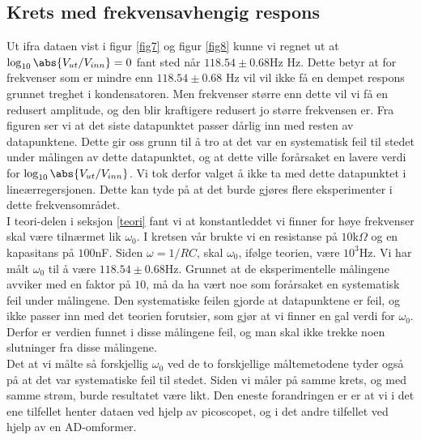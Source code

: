 \documentclass[%
 reprint,
 amsmath,amssymb,
 aps,
]{revtex4-1}
\begin{document}
\subsection{Krets med frekvensavhengig respons}
Ut ifra dataen vist i figur \ref{fig7} og figur \ref{fig8} kunne vi regnet ut at $\log_{10} \abs{{V_{ut}/V_{inn}}} = 0$ fant sted når $118.54 \pm 0.68$Hz Hz. Dette betyr at for frekvenser som er mindre enn $118.54 \pm 0.68$ Hz vil vil ikke få en dempet respons grunnet treghet i kondensatoren. Men frekvenser større enn dette vil vi få en redusert amplitude, og den blir kraftigere redusert jo større frekvensen er. Fra figuren ser vi at det siste datapunktet passer dårlig inn med resten av datapunktene. Dette gir oss grunn til å tro at det var en systematisk feil til stedet under målingen av dette datapunktet, og at dette ville forårsaket en lavere verdi for $\log_{10} \abs{{V_{ut}/V_{inn}}}$. Vi tok derfor valget å ikke ta med dette datapunktet i lineærregersjonen. Dette kan tyde på at det burde gjøres flere eksperimenter i dette frekvensområdet.\\
I teori-delen i seksjon \ref{teori} fant vi at konstantleddet vi finner for høye frekvenser skal være tilnærmet lik $\omega_0$. I kretsen vår brukte vi en resistanse på $10$k$\Omega$ og en kapasitans på $100$nF. Siden $\omega = 1/RC$, skal $\omega_0$, ifølge teorien, være $10^3$Hz. Vi har målt $\omega_0$ til å være $118.54\pm0.68$Hz. Grunnet at de eksperimentelle målingene avviker med en faktor på $10$, må da ha vært noe som forårsaket en systematisk feil under målingene. Den systematiske feilen gjorde at datapunktene er feil, og ikke passer inn med det teorien forutsier, som gjør at vi finner en gal verdi for $\omega_0$. Derfor er verdien funnet i disse målingene feil, og man skal ikke trekke noen slutninger fra disse målingene. \\
Det at vi målte så forskjellig $\omega_0$ ved de to forskjellige måltemetodene tyder også på at det var systematiske feil til stedet. Siden vi måler på samme krets, og med samme strøm, burde resultatet være likt. Den eneste forandringen er er at vi i det ene tilfellet henter dataen ved hjelp av picoscopet, og i det andre tilfellet ved hjelp av en AD-omformer.
\end{document}
